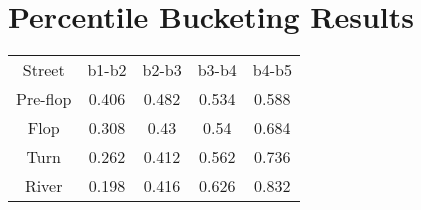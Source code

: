 \documentclass{article}
\begin{document}
\section{Percentile Bucketing Results}
\begin{center}
\begin{tabular}{ c c c c c }
Street & b1-b2 & b2-b3 & b3-b4 & b4-b5\\
Pre-flop & 0.406 & 0.482 & 0.534 & 0.588\\ 
Flop & 0.308 & 0.43 & 0.54 & 0.684\\
Turn & 0.262 & 0.412 & 0.562 & 0.736\\
River & 0.198 & 0.416 & 0.626 & 0.832
\end{tabular}
\end{center}
\end{document}
